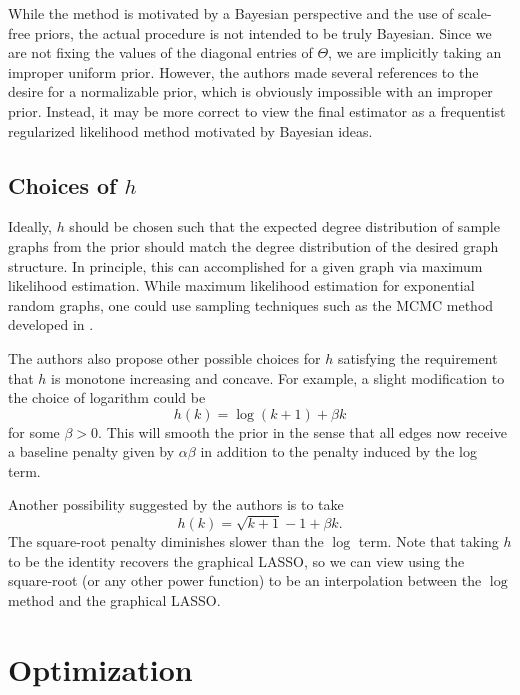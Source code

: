 \documentclass{uwstat572}
\theoremstyle{remark}
\theoremstyle{definition}
\begin{document}
While the method is motivated by a Bayesian perspective and the use of scale-free priors, the actual procedure is not intended to be truly Bayesian.  Since we are not fixing the values of the diagonal entries of $\Theta$, we are implicitly taking an improper uniform prior.  However, the authors made several references to the desire for a normalizable prior, which is obviously impossible with an improper prior.  Instead, it may be more correct to view the final estimator as a frequentist regularized likelihood method motivated by Bayesian ideas.



\subsection{Choices of $h$}

Ideally, $h$ should be chosen such that the expected degree distribution of sample graphs from the prior should match the degree distribution of the desired graph structure.  In principle, this can accomplished for a given graph via maximum likelihood estimation.  While maximum likelihood estimation for exponential random graphs, one could use sampling techniques such as the MCMC method developed in \cite{snijders2002markov}.  

The authors also propose other possible choices for $h$ satisfying the requirement that $h$ is monotone increasing and concave.  For example, a slight modification to the choice of logarithm could be
\begin{equation*}
    h(k) = \log(k + 1) + \beta k
\end{equation*}
for some $\beta > 0$.  This will smooth the prior in the sense that all edges now receive a baseline penalty given by $\alpha \beta$ in addition to the penalty induced by the log term.

Another possibility suggested by the authors is to take
\begin{equation*}
    h(k) = \sqrt{k+1} - 1 + \beta k.
\end{equation*}
The square-root penalty diminishes slower than the $\log$ term.  Note that taking $h$ to be the identity recovers the graphical LASSO, so we can view using the square-root (or any other power function) to be an interpolation between the $\log$ method and the graphical LASSO.



\section{Optimization}
\end{document}
